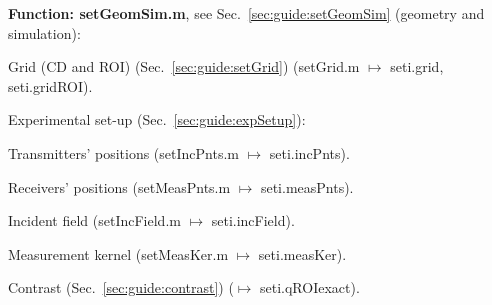 \hrulefill

\textbf{Function: \textsf{setGeomSim.m}}, see Sec.~\ref{sec:guide:setGeomSim} (geometry and simulation):

\begin{compactitem}
\item Grid (CD and ROI) (Sec.~\ref{sec:guide:setGrid}) (\textsf{setGrid.m} $\mapsto$ \textsf{seti.grid}, \textsf{seti.gridROI}).
\item Experimental set-up (Sec.~\ref{sec:guide:expSetup}):
 \begin{compactitem}
 \item Transmitters' positions (\textsf{setIncPnts.m} $\mapsto$ \textsf{seti.incPnts}).
 \item Receivers' positions (\textsf{setMeasPnts.m} $\mapsto$ \textsf{seti.measPnts}).
 \item Incident field (\textsf{setIncField.m} $\mapsto$ \textsf{seti.incField}).
 \item Measurement kernel (\textsf{setMeasKer.m} $\mapsto$ \textsf{seti.measKer}).
 \end{compactitem}
 \item Contrast (Sec.~\ref{sec:guide:contrast}) ($\mapsto$ \textsf{seti.qROIexact}).
\end{compactitem}

\hrulefill


